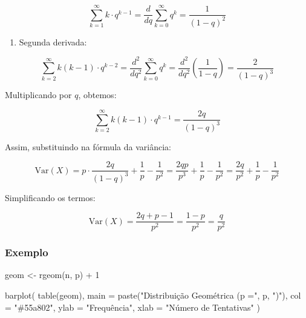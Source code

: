 \documentclass[
]{article}
\newenvironment{Shaded}{\begin{snugshade}}{\end{snugshade}}
\newcommand{\AttributeTok}[1]{\textcolor[rgb]{0.77,0.63,0.00}{#1}}
\newcommand{\DecValTok}[1]{\textcolor[rgb]{0.00,0.00,0.81}{#1}}
\newcommand{\FunctionTok}[1]{\textcolor[rgb]{0.00,0.00,0.00}{#1}}
\newcommand{\NormalTok}[1]{#1}
\newcommand{\OtherTok}[1]{\textcolor[rgb]{0.56,0.35,0.01}{#1}}
\newcommand{\SpecialCharTok}[1]{\textcolor[rgb]{0.00,0.00,0.00}{#1}}
\newcommand{\StringTok}[1]{\textcolor[rgb]{0.31,0.60,0.02}{#1}}
\providecommand{\tightlist}{%
  \setlength{\itemsep}{0pt}\setlength{\parskip}{0pt}}
\begin{document}
\[
\sum_{k=1}^{\infty} k \cdot q^{k - 1} = \frac{d}{dq} \sum_{k=0}^{\infty} q^k = \frac{1}{(1 - q)^2}
\]

\begin{enumerate}
\def\labelenumi{\arabic{enumi}.}
\setcounter{enumi}{1}
\tightlist
\item
  Segunda derivada:
\end{enumerate}

\[
\sum_{k=2}^{\infty} k(k-1) \cdot q^{k - 2} = \frac{d^2}{dq^2} \sum_{k=0}^{\infty} q^k = \frac{d^2}{dq^2} \left(\frac{1}{1 - q}\right) = \frac{2}{(1 - q)^3}
\]

Multiplicando por \(q\), obtemos:

\[
\sum_{k=2}^{\infty} k(k-1) \cdot q^{k - 1} = \frac{2q}{(1 - q)^3}
\]

Assim, substituindo na fórmula da variância:

\[
\text{Var}(X) = p \cdot \frac{2q}{(1 - q)^3} + \frac{1}{p} - \frac{1}{p^2} = \frac{2q p}{p^3} + \frac{1}{p} - \frac{1}{p^2} = \frac{2q}{p^2} + \frac{1}{p} - \frac{1}{p^2}
\]

Simplificando os termos:

\[
\text{Var}(X) = \frac{2q + p - 1}{p^2} = \frac{1 - p}{p^2} = \frac{q}{p^2}
\]

\hypertarget{exemplo-geom}{%
\subsubsection{Exemplo}\label{exemplo-geom}}

\begin{Shaded}
\begin{Highlighting}[]
\NormalTok{geom }\OtherTok{\textless{}{-}} \FunctionTok{rgeom}\NormalTok{(n, p) }\SpecialCharTok{+} \DecValTok{1}

\FunctionTok{barplot}\NormalTok{(}
  \FunctionTok{table}\NormalTok{(geom),}
  \AttributeTok{main =} \FunctionTok{paste}\NormalTok{(}\StringTok{"Distribuição Geométrica (p ="}\NormalTok{, p, }\StringTok{")"}\NormalTok{),}
  \AttributeTok{col =} \StringTok{"\#55a802"}\NormalTok{,}
  \AttributeTok{ylab =} \StringTok{"Frequência"}\NormalTok{,}
  \AttributeTok{xlab =} \StringTok{"Número de Tentativas"}
\NormalTok{)}
\end{Highlighting}
\end{Shaded}
\end{document}
